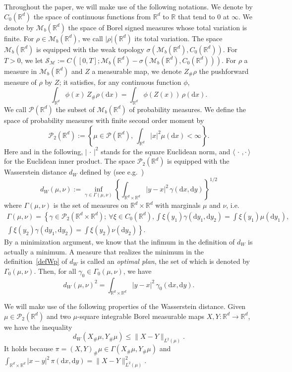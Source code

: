 \documentclass[11pt]{article}
\theoremstyle{definition}
\numberwithin{equation}{section}
\newcommand*{\dd}{\mathrm{d}}
\newcommand*{\dx}{\dd x}
\newcommand*{\dy}{\dd y}
\newcommand*\RR{\mathbb{R}}
\newcommand*\calM{{\mathcal M}}
\newcommand*\calP{{\mathcal P}}
\newcommand*\smes{\mathcal{S}_{\mathcal{M}}}
\let\oldforall\forall
\renewcommand*{\forall}{\mathrel{\oldforall}}
\begin{document}
Throughout the paper, we will make use of the following notations. We denote by $C_0(\RR^d)$ the space of continuous functions from $\RR^d$ to $\RR$ that tend to $0$ at $\infty$. We denote by $\calM_b(\RR^d)$ the space of Borel signed measures whose total variation is finite. For $\rho\in \mathcal{M}_{b}(\RR^d)$, we call $|\rho|(\RR^d)$ its total variation. The space $\calM_b(\RR^d)$ is equipped with the weak topology $\sigma(\mathcal{M}_b(\RR^d),C_0(\RR^d))$. For $T>0$, we let $\smes :=C([0,T];\mathcal{M}_b(\RR^d)-\sigma(\mathcal{M}_b(\RR^d),C_0(\RR^d)))$. For $\rho$ a measure in $\calM_b(\RR^d)$ and $Z$ a measurable map, we denote $Z_\#\rho$ the pushforward measure of $\rho$ by $Z$; it satisfies, for any continuous function $\phi$,
\[
\int_{\RR^d} \phi(x)\, Z_\#\rho(\dx) = \int_{\RR^d} \phi(Z(x))\,\rho(\dx).
\]
We call $\calP(\RR^d)$ the subset of $\calM_b(\RR^d)$ of probability measures. We define the space of probability measures with finite second order moment by
\[
\calP_2(\RR^d) := \left\{\mu \in \calP(\RR^d),\ \int_{\RR^d} |x|^2 \mu(\dx) <\infty\right\}.
\]
Here and in the following, $|{\,\cdot\,}|^2$ stands for the square Euclidean norm, and $\langle{\,\cdot\,,\cdot\,}\rangle$ for the Euclidean inner product. The space ${\mathcal P}_{2}(\RR^d)$ is equipped with the Wasserstein distance $d_W$ defined by (see e.g.~\cite{Ambrosio,Villani2, Villani1, Filippoctouo})
\begin{equation}\label{defWp}
d_W(\mu,\nu) := \inf_{\gamma\in \Gamma(\mu,\nu)} \left\{\int_{\RR^d\times \RR^d} |y-x|^2\,\gamma(\dx,\dy)\right\}^{1/2}
\end{equation}
where $\Gamma(\mu,\nu)$ is the set of measures on $\RR^d\times\RR^d$ with marginals $\mu$ and $\nu$, i.e.
\begin{align*}
\Gamma(\mu,\nu) = \left\{ \gamma\in \calP_2(\RR^d\times\RR^d);\ \forall \xi\in C_0(\RR^d), 
\int \xi(y_1)\gamma(\dy_1,\dy_2) = \int \xi(y_1) \mu(\dy_1),\right. \;\; \\
\left.\int \xi(y_2)\gamma(\dy_1,\dy_2) = \int \xi(y_2) \nu(\dy_2) \right\}.
\end{align*}
By a minimization argument, we know that the infimum in the definition of $d_{W}$ is actually a minimum. A measure that realizes the minimum in the definition~\eqref{defWp} of $d_W$ is called an \emph{optimal plan}, the set of which is denoted by $\Gamma_0(\mu,\nu)$. Then, for all $\gamma_0\in \Gamma_0(\mu,\nu)$, we have
\[
d_W(\mu,\nu)^2= \int_{\RR^d\times \RR^d} |y-x|^2\,\gamma_0(\dx,\dy).
\]

We will make use of the following properties of the Wasserstein distance. Given $\mu \in {\mathcal P}_{2}(\RR^d)$ and two $\mu$-square integrable Borel measurable maps $X,Y:\RR^d\to \RR^d$, we have the inequality
\begin{equation*}
d_W(X_\#\mu,Y_\#\mu) \leq \|X-Y\|_{L^2(\mu)}.
\end{equation*}
It holds because $\pi=(X,Y)_\# \mu\in \Gamma(X_\#\mu,Y_\#\mu)$ and $\int_{\RR^d\times \RR^d} |x-y|^2\,\pi(\dx,\dy)=\|X-Y\|_{L^2(\mu)}^2$.
\end{document}

